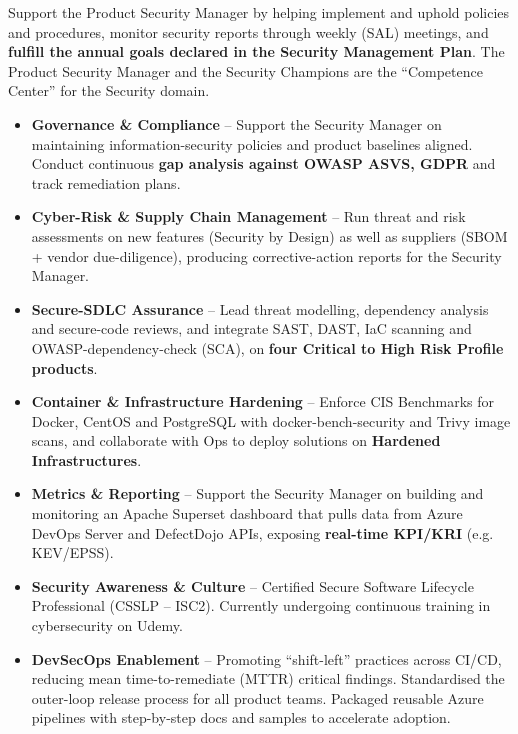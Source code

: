 	\newline

	Support the Product Security Manager by helping implement and uphold policies and procedures, monitor security reports through weekly (SAL) meetings, and \textbf{fulfill the annual goals declared in the Security Management Plan}. The Product Security Manager and the Security Champions are the ``Competence Center'' for the Security domain.

	\medskip

	\begin{itemize}
		\item \textbf{Governance \& Compliance} – Support the Security Manager on maintaining information-security policies and product baselines aligned. Conduct continuous \textbf{gap analysis against OWASP ASVS, GDPR} and track remediation plans.

		\item \textbf{Cyber-Risk \& Supply Chain Management} – Run threat and risk assessments on new features (Security by Design) as well as suppliers (SBOM + vendor due-diligence), producing corrective-action reports for the Security Manager.

		\item \textbf{Secure-SDLC Assurance} – Lead threat modelling, dependency analysis and secure-code reviews, and integrate SAST, DAST, IaC scanning and OWASP-dependency-check (SCA), on \textbf{four Critical to High Risk Profile products}.

		\item \textbf{Container \& Infrastructure Hardening} – Enforce CIS Benchmarks for Docker, CentOS and PostgreSQL with docker-bench-security and Trivy image scans, and collaborate with Ops to deploy solutions on \textbf{Hardened Infrastructures}.

		\item \textbf{Metrics \& Reporting} – Support the Security Manager
		      on building and monitoring an Apache Superset dashboard that pulls data from Azure DevOps Server and DefectDojo APIs, exposing \textbf{real-time KPI/KRI} (e.g. KEV/EPSS).

		\item \textbf{Security Awareness \& Culture} – 	Certified Secure Software Lifecycle Professional (CSSLP – ISC2). Currently undergoing continuous training in cybersecurity on Udemy.

		\item \textbf{DevSecOps Enablement} – Promoting “shift-left” practices across CI/CD, reducing mean time-to-remediate (MTTR) critical findings. Standardised the outer-loop release process for all product teams. Packaged reusable Azure pipelines with step-by-step docs and samples to accelerate adoption.
	\end{itemize}
	\smallskip

